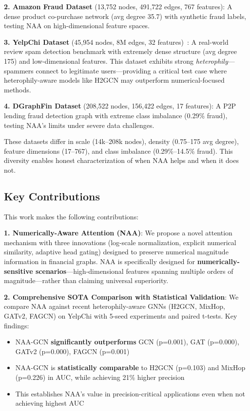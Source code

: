 \textbf{2. Amazon Fraud Dataset} (13,752 nodes, 491,722 edges, 767 features): A dense product co-purchase network (avg degree 35.7) with synthetic fraud labels, testing NAA on high-dimensional feature spaces.

\textbf{3. YelpChi Dataset} (45,954 nodes, 8M edges, 32 features)~\cite{mukherjee2013yelp,dou2020enhancing}: A real-world review spam detection benchmark with extremely dense structure (avg degree 175) and low-dimensional features. This dataset exhibits strong \textit{heterophily}---spammers connect to legitimate users---providing a critical test case where heterophily-aware models like H2GCN may outperform numerical-focused methods.

\textbf{4. DGraphFin Dataset} (208,522 nodes, 156,422 edges, 17 features): A P2P lending fraud detection graph with extreme class imbalance (0.29\% fraud), testing NAA's limits under severe data challenges.

These datasets differ in scale (14k--208k nodes), density (0.75--175 avg degree), feature dimensions (17--767), and class imbalance (0.29\%--14.5\% fraud). This diversity enables honest characterization of when NAA helps and when it does not.

\subsection{Key Contributions}

This work makes the following contributions:

\textbf{1. Numerically-Aware Attention (NAA)}: We propose a novel attention mechanism with three innovations (log-scale normalization, explicit numerical similarity, adaptive head gating) designed to preserve numerical magnitude information in financial graphs. NAA is specifically designed for \textbf{numerically-sensitive scenarios}---high-dimensional features spanning multiple orders of magnitude---rather than claiming universal superiority.

\textbf{2. Comprehensive SOTA Comparison with Statistical Validation}: We compare NAA against recent heterophily-aware GNNs (H2GCN, MixHop, GATv2, FAGCN) on YelpChi with 5-seed experiments and paired t-tests. Key findings:
\begin{itemize}
\item NAA-GCN \textbf{significantly outperforms} GCN (p=0.001), GAT (p=0.000), GATv2 (p=0.000), FAGCN (p=0.001)
\item NAA-GCN is \textbf{statistically comparable} to H2GCN (p=0.103) and MixHop (p=0.226) in AUC, while achieving 21\% higher precision
\item This establishes NAA's value in precision-critical applications even when not achieving highest AUC
\end{itemize}

